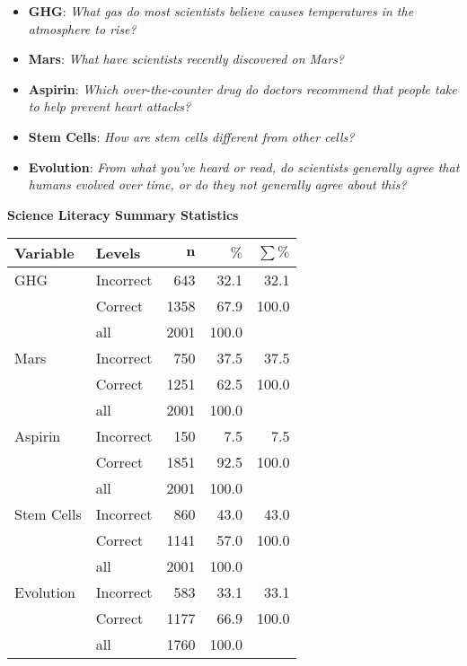 \documentclass[a0,final]{a0poster}
\begin{document}
\begin{multicols}{3}
\begin{itemize}
\item \textbf{GHG}: \textit{What gas do most scientists believe causes temperatures in the atmosphere to rise?}
\item \textbf{Mars}: \textit{What have scientists recently discovered on Mars?}
\item \textbf{Aspirin}: \textit{Which over-the-counter drug do doctors recommend that people take to help prevent heart attacks?}
\item \textbf{Stem Cells}: \textit{How are stem cells different from other cells?}
\item \textbf{Evolution}: \textit{From what you’ve heard or read, do scientists generally agree that humans evolved over time, or do they not generally agree about this?}
\end{itemize}

\vspace{0.25in}

\textbf{Science Literacy Summary Statistics} \\

\begin{center}
{
\begin{tabular}{llrrr}
\tiny
 \textbf{Variable} & \textbf{Levels} & $\mathbf{n}$ & $\mathbf{\%}$ & $\mathbf{\sum \%}$ \\ 
  \hline
GHG & Incorrect & 643 & 32.1 & 32.1 \\ 
   & Correct & 1358 & 67.9 & 100.0 \\ 
   \hline
 & all & 2001 & 100.0 &  \\ 
   \hline
\hline
Mars & Incorrect & 750 & 37.5 & 37.5 \\ 
   & Correct & 1251 & 62.5 & 100.0 \\ 
   \hline
 & all & 2001 & 100.0 &  \\ 
   \hline
\hline
Aspirin & Incorrect & 150 & 7.5 & 7.5 \\ 
   & Correct & 1851 & 92.5 & 100.0 \\ 
   \hline
 & all & 2001 & 100.0 &  \\ 
   \hline
\hline
Stem Cells & Incorrect & 860 & 43.0 & 43.0 \\ 
   & Correct & 1141 & 57.0 & 100.0 \\ 
   \hline
 & all & 2001 & 100.0 &  \\ 
   \hline
\hline
Evolution & Incorrect & 583 & 33.1 & 33.1 \\ 
   & Correct & 1177 & 66.9 & 100.0 \\ 
   \hline
 & all & 1760 & 100.0 &  \\ 
   \hline
\hline
\end{tabular}
}
\end{center}


\end{multicols}
\end{document}
